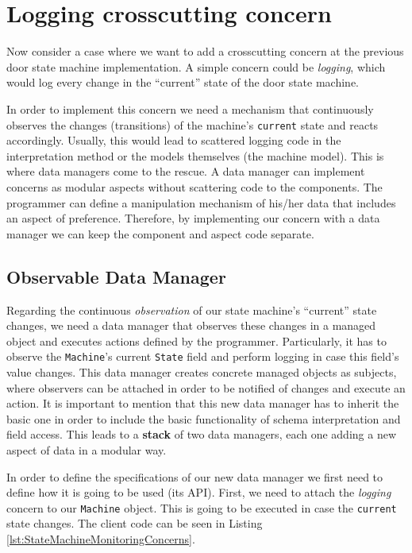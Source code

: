 \section{Logging crosscutting concern}
Now consider a case where we want to add a crosscutting concern at the previous door state machine implementation.
A simple concern could be \textit{logging}, which would log every change in the ``current'' state of the door state machine.

In order to implement this concern we need a mechanism that continuously observes the changes (transitions) of the machine's \texttt{current} state and reacts accordingly.
Usually, this would lead to scattered logging code in the interpretation method or the models themselves (the machine model).
This is where data managers come to the rescue.
A data manager can implement concerns as modular aspects without scattering code to the components.
The programmer can define a manipulation mechanism of his/her data that includes an aspect of preference.
Therefore, by implementing our concern with a data manager we can keep the component and aspect code separate.

\subsection{Observable Data Manager}
Regarding the continuous \textit{observation} of our state machine's ``current'' state changes, we need a data manager that observes these changes in a managed object and executes actions defined by the programmer.
Particularly, it has to observe the \texttt{Machine}'s current \texttt{State} field and perform logging in case this field's value changes.
This data manager creates concrete managed objects as subjects, where observers can be attached in order to be notified of changes and execute an action.
It is important to mention that this new data manager has to inherit the basic one in order to include the basic functionality of schema interpretation and field access.
This leads to a \textbf{stack} of two data managers, each one adding a new aspect of data in a modular way.

In order to define the specifications of our new data manager we first need to define how it is going to be used (its API).
First, we need to attach the \textit{logging} concern to our \texttt{Machine} object. 
This is going to be executed in case the \texttt{current} state changes.
The client code can be seen in Listing \ref{lst:StateMachineMonitoringConcerns}.

